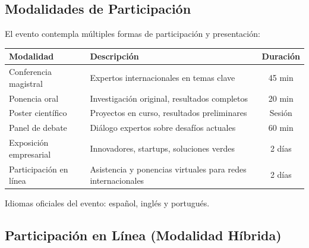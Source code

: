 \documentclass[12pt,a4paper]{article}
\begin{document}
\subsection{Modalidades de Participación}

El evento contempla múltiples formas de participación y presentación:

\begin{table}[H]
\centering
\begin{tabular}{|l|p{10cm}|c|}
\hline
\rowcolor{verdeclaro}
\textbf{Modalidad} & \textbf{Descripción} & \textbf{Duración} \\
\hline
Conferencia magistral & Expertos internacionales en temas clave & 45 min \\
\hline
Ponencia oral & Investigación original, resultados completos & 20 min \\
\hline
Poster científico & Proyectos en curso, resultados preliminares & Sesión \\
\hline
Panel de debate & Diálogo expertos sobre desafíos actuales & 60 min \\
\hline
Exposición empresarial & Innovadores, startups, soluciones verdes & 2 días \\
\hline
Participación en línea & Asistencia y ponencias virtuales para redes internacionales & 2 días \\
\hline
\end{tabular}
\end{table}

Idiomas oficiales del evento: español, inglés y portugués.

\subsection{Participación en Línea (Modalidad Híbrida)}
\end{document}
